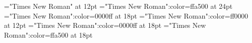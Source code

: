 \documentclass[a4paper]{article}
\begin{document}
 
\pagestyle{plain} 
\sloppy 
\setlength{\parfillskip}{0pt plus 1fil} 
\font\main="Times New Roman" at 12pt
\font\abcmain="Times New Roman":color=ffa500 at 24pt
\font\amain="Times New Roman":color=0000ff at 18pt
\font\bmain="Times New Roman":color=ff0000 at 12pt
\font\abenmain="Times New Roman":color=0000ff at 18pt
\font\acmain="Times New Roman":color=ffa500 at 18pt

\pagestyle{fancy} 






\end{document}
